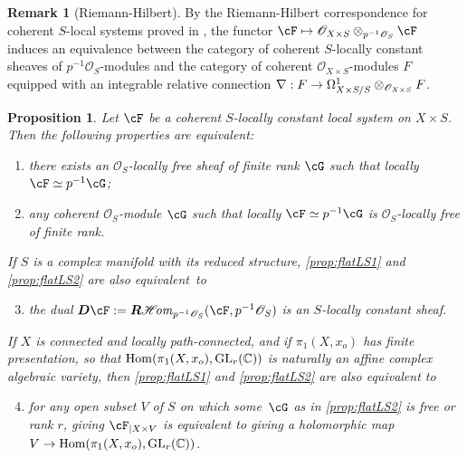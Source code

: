 \documentclass[english]{smfart}
\numberwithin{subsection}{section}
\def\sho{\mathcal{O}}\let\cO\sho
\newcommand{\bD}{\boldsymbol{D}}
\newcommand{\bR}{\boldsymbol{R}}
\newcommand{\shhom}{\mathcal{H}\!\mathit{om}}\let\ho\shhom
\newcommand{\XS}{X\times S}
\DeclareMathOperator{\GL}{GL}
\DeclareMathOperator{\Hom}{Hom}
\newcommand{\pOS}{p^{-1}\sho_S}
\numberwithin{equation}{section}
\theoremstyle{plain}
\newtheorem{proposition}[equation]{Proposition}
\theoremstyle{definition}
\newtheorem{remark}[equation]{Remark}
\def\to{\mathchoice{\longrightarrow}{\rightarrow}{\rightarrow}{\rightarrow}}
\def\mto{\mathchoice{\longmapsto}{\mapsto}{\mapsto}{\mapsto}}
\begin{document}
\begin{remark}[Riemann-Hilbert]\label{rem:RH}
By the Riemann-Hilbert correspondence for coherent $S$-local systems proved in \cite[Th.\,2.23 p.\,14]{Deligne70}, the functor $\cF\mto\cO_{\XS}\otimes_{\pOS}\cF$ induces an equivalence between the category of coherent $S$-locally constant sheaves of $\pOS$-modules and the category of coherent $\cO_{\XS}$-modules $F$ equipped with an integrable relative connection $\nabla:F\to\Omega^1_{\XS/S}\otimes_{\cO_{\XS}}F$.
\end{remark}

\begin{comment}
\subsection{Flat families of local systems}
\end{comment}

\begin{proposition}\label{prop:flatLS}
Let $\cF$ be a coherent $S$-locally constant local system on $\XS$. Then the following properties are equivalent:
\begin{enumerate}
\item\label{prop:flatLS1}
there exists an $\sho_S$-locally free sheaf of finite rank $\cG$ such that locally $\cF\simeq p^{-1}\cG$;
\item\label{prop:flatLS2}
any coherent $\sho_S$-module $\cG$ such that locally $\cF\simeq p^{-1}\cG$ is $\sho_S$-locally free of finite rank.
\end{enumerate}

If $S$ is a complex manifold with its reduced structure, \eqref{prop:flatLS1} and \eqref{prop:flatLS2} are also equivalent~to
\begin{enumerate}\setcounter{enumi}{2}
\item\label{prop:flatLS3}
the dual $\bD\cF:=\bR\shhom_{\pOS}(\cF,\pOS)$ is an $S$-locally constant sheaf.
\end{enumerate}

If $X$ is connected and locally path-connected, and if $\pi_1(X,x_o)$ has finite presentation, so that $\Hom(\pi_1(X,x_o),\GL_r(\CC))$ is naturally an affine complex algebraic variety, then \eqref{prop:flatLS1} and \eqref{prop:flatLS2} are also equivalent to
\begin{enumerate}\setcounter{enumi}{3}
\item\label{prop:flatLS4}
for any open subset $V$ of $S$ on which some~$\cG$ as in \eqref{prop:flatLS2} is free or rank $r$, giving $\cF_{|X\times V}$ is equivalent to giving a holomorphic map $V\to\Hom(\pi_1(X,x_o),\GL_r(\CC))$.
\end{enumerate}
\end{proposition}
\end{document}
